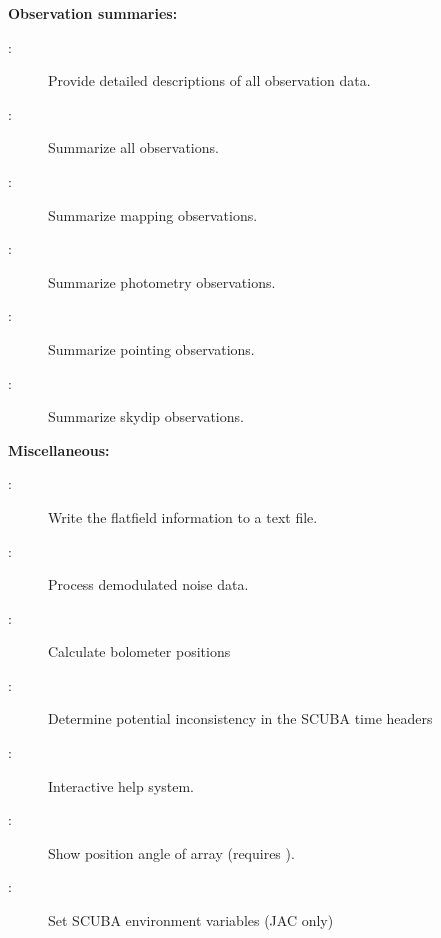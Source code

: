 \documentclass[twoside,11pt]{starlink}
\providecommand{\Kappa}{\xref{{\textsc{Kappa}}}{sun95}{}}
\begin{document}
\begin{description}

\item \textbf{Observation summaries:}

\begin{description}

\item[:] Provide detailed descriptions of all
observation  data.

\item[:] Summarize all observations.

\item[:] Summarize mapping observations.

\item[:] Summarize photometry observations.

\item[:] Summarize pointing observations.

\item[:] Summarize skydip observations.

\end{description}

\item \textbf{Miscellaneous:}

\begin{description}

\item[:] Write the flatfield information
to a text file.

\item[:] Process demodulated noise data.

\item[:] Calculate bolometer positions

\item[:] Determine potential inconsistency in the SCUBA time headers

\item[:] Interactive help system.

\item[:] Show position angle of array (requires \Kappa).

\item[:] Set SCUBA environment variables (JAC only)


\end{description}
\end{description}
\end{document}
